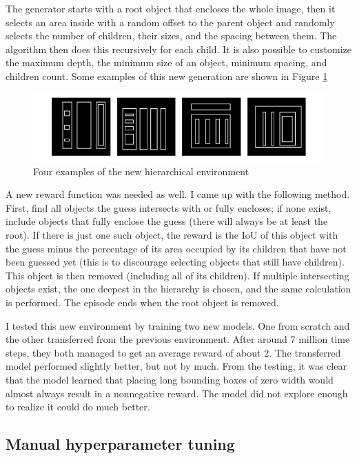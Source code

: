 \documentclass[
  digital,     %
  oneside,     %
  nosansbold,  %
  nocolorbold, %
  lof,         %
  lot,         %
]{fithesis4}
\begin{document}
The generator starts with a root object that encloses the whole image, then it selects an area inside with a random offset to the parent object and randomly selects the number of children, their sizes, and the spacing between them. The algorithm then does this recursively for each child. It is also possible to customize the maximum depth, the minimum size of an object, minimum spacing, and children count. Some examples of this new generation are shown in Figure \ref{fig:env7}

\begin{figure}
    \centering
    \includegraphics[width=1\linewidth]{env_examples/env7.pdf}
    \caption{Four examples of the new hierarchical environment}
    \label{fig:env7}
\end{figure}

A new reward function was needed as well. I came up with the following method. First, find all objects the guess intersects with or fully encloses; if none exist, include objects that fully enclose the guess (there will always be at least the root). If there is just one such object, the reward is the IoU of this object with the guess minus the percentage of its area occupied by its children that have not been guessed yet (this is to discourage selecting objects that still have children). This object is then removed (including all of its children). If multiple intersecting objects exist, the one deepest in the hierarchy is chosen, and the same calculation is performed. The episode ends when the root object is removed.

I tested this new environment by training two new models. One from scratch and the other transferred from the previous environment. After around 7 million time steps, they both managed to get an average reward of about 2. The transferred model performed slightly better, but not by much. From the testing, it was clear that the model learned that placing long bounding boxes of zero width would almost always result in a nonnegative reward. The model did not explore enough to realize it could do much better.

\subsection{Manual hyperparameter tuning}
\end{document}
